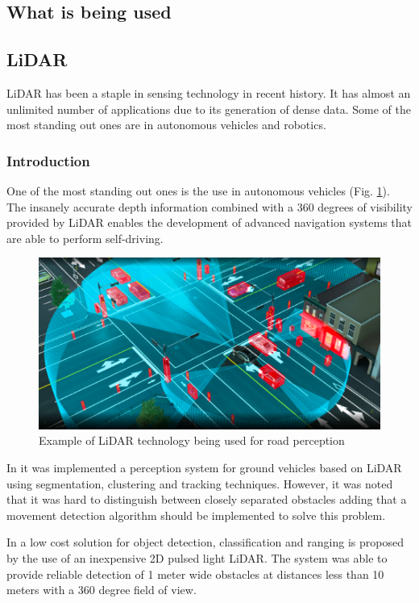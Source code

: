 \subsection{What is being used}

\subsection{LiDAR}
\ac{LiDAR} has been a staple in sensing technology in recent history. It has almost an  unlimited  number of applications \cite{lidar100uses} due to its generation of dense data. Some of the most standing out ones are in autonomous vehicles and robotics. 
\subsubsection{Introduction}

 One of the most standing out ones is the use in autonomous vehicles (Fig. \ref{fig:lidarcar}). The insanely accurate depth information combined with a 360 degrees of visibility provided by \ac{LiDAR} enables the development of advanced navigation systems that are able to perform self-driving.
\begin{figure}[h] 
\centerline{\includegraphics [width=0.7 \textwidth]{imgs/chapter2/lidarcar.png}}
\caption{Example of \ac{LiDAR} technology being used for road perception \cite{lidarcar}}
\label{fig:lidarcar}
\end{figure}

In \cite{lidarperception}  it was implemented a perception system for ground vehicles based on \ac{LiDAR} using segmentation, clustering and tracking techniques. However, it was noted that it was hard to distinguish between closely  separated obstacles adding that a movement detection algorithm should be implemented to solve this problem. 


In \cite{car2dlidar} a low cost solution for object detection, classification and ranging is  proposed by the use of an inexpensive 2D pulsed light \ac{LiDAR}. The system was able to provide reliable detection of 1 meter wide obstacles at distances less than 10 meters with a 360 degree field of view.   


